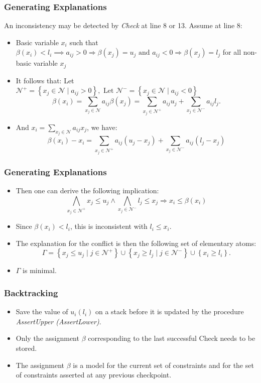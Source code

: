 \documentclass[aspectratio=169%
,serif,mathserif]{beamer}
\begin{document}
\begin{frame}
	\frametitle{Generating Explanations}
	An inconsistency may be detected by \emph{Check} at line 8 or 13. Assume at line 8:
	\begin{itemize}
		\item Basic variable $x_i$ such that $\beta\left(x_{i}\right)<l_{i} \implies a_{i j}>0 \Rightarrow \beta\left(x_{j}\right) = u_{j} \text { and } a_{i j}<0 \Rightarrow \beta\left(x_{j}\right) = l_{j}$ for all non-basic variable $x_j$
		\item It follows that: Let $ \mathcal{N}^{+}=\left\{x_{j} \in \mathcal{N} \mid a_{i j}>0\right\},\text { Let } \mathcal{N}^{-}=\left\{x_{j} \in \mathcal{N} \mid a_{i j}<0\right\}$
			$$
			\beta\left(x_{i}\right)=\sum_{x_{j} \in \mathcal{N}} a_{i j} \beta\left(x_{j}\right)=\sum_{x_{j} \in \mathcal{N}^{+}} a_{i j} u_{j}+\sum_{x_{j} \in \mathcal{N}^{-}} a_{i j} l_{j} .
			$$
		\item And $x_{i}=\sum_{x_{j} \in \mathcal{N}} a_{i j} x_{j}$, we have:
			$$
			\beta\left(x_{i}\right)-x_{i}=\sum_{x_{j} \in \mathcal{N}^{+}} a_{i j}\left(u_{j}-x_{j}\right)+\sum_{x_{j} \in \mathcal{N}^{-}} a_{i j}\left(l_{j}-x_{j}\right)
			$$
	\end{itemize}

\end{frame}

\begin{frame}
	\frametitle{Generating Explanations}
	\begin{itemize}
		\item Then one can derive the following implication:
			$$
			\bigwedge_{x_{j} \in \mathcal{N}^{+}} x_{j} \leq u_{j} \wedge \bigwedge_{x_{j} \in \mathcal{N}^{-}} l_{j} \leq x_{j} \Rightarrow x_{i} \leq \beta\left(x_{i}\right)
			$$
		\item Since $\beta\left(x_{i}\right)<l_{i}$, this is inconsistent with $l_{i} \leq x_{i}$.
		\item The explanation for the conflict is then the following set of elementary atoms:
			$$
			\Gamma=\left\{x_{j} \leq u_{j} \mid j \in \mathcal{N}^{+}\right\} \cup\left\{x_{j} \geq l_{j} \mid j \in \mathcal{N}^{-}\right\} \cup\left\{x_{i} \geq l_{i}\right\} .
			$$
		\item $\Gamma$ is minimal.
	\end{itemize}
\end{frame}

\begin{frame}
	\frametitle{Backtracking}
	\begin{itemize}
		\item Save the value of $u_i (l_i)$ on a stack before it is updated by the procedure \emph{AssertUpper (AssertLower)}.
		\item Only the assignment $\beta$ corresponding to the last successful Check needs to be stored.
		\item The assignment $\beta$ is a model for the current set of constraints and for the set of constraints asserted at any previous checkpoint.
	\end{itemize}
\end{frame}
\end{document}
